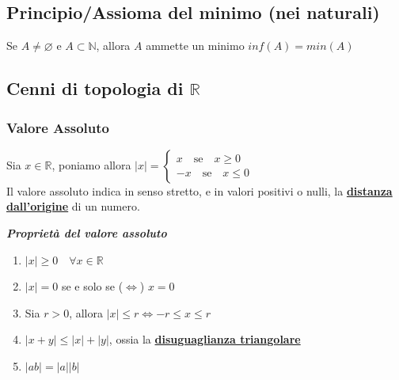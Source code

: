 \documentclass{article}
\theoremstyle{definition}
\begin{document}
\subsection{Principio/Assioma del minimo (nei naturali)}
Se $A \neq \varnothing$ e $A \subset \mathbb{N}$, allora $A$ ammette un minimo $inf(A)=min(A)$
\newpage
\subsection{Cenni di topologia di $\mathbb{R}$}
\subsubsection{Valore Assoluto}
Sia $x \in \mathbb{R}$, poniamo allora $|x|=\begin{cases}
    x \,\,\,\,\,\, \mbox{se} \,\,\,\,\,\, x \geqslant 0 \\ 
    -x \,\,\,\,\,\, \mbox{se} \,\,\,\,\,\, x \leqslant 0
\end{cases}$
\\
Il valore assoluto indica in senso stretto, e in valori positivi o nulli, la \underline{\textbf{distanza dall'origine}} di un numero.

\begin{center}
    \textbf{\textit{{Proprietà del valore assoluto}}}
\end{center}
\begin{enumerate}
    \item $|x| \geqslant0 \,\,\,\,\,\, \forall x \in \mathbb{R}$
    \item $|x| =0$ se e solo se ($\Longleftrightarrow$) $x=0$
    \item Sia $r >0$, allora $|x| \leqslant r \Longleftrightarrow -r \leqslant x \leqslant r$
    \item$ |x+y|\leqslant |x|+ |y|$, ossia la \textbf{\underline{disuguaglianza triangolare}}
    \item $|ab|=|a||b|$
    \end{enumerate}
\end{document}
